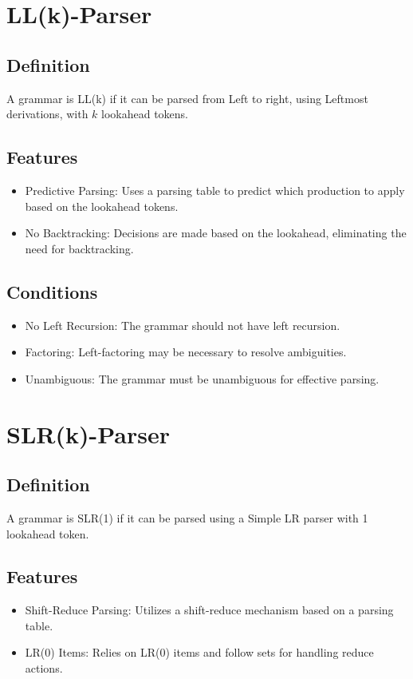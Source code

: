 \section{LL(k)-Parser}

\subsection{Definition}
A grammar is LL(k) if it can be parsed from Left to right, using Leftmost derivations, with \( k \) lookahead tokens.

\subsection{Features}
\begin{itemize}
    \item Predictive Parsing: Uses a parsing table to predict which production to apply based on the lookahead tokens.
    \item No Backtracking: Decisions are made based on the lookahead, eliminating the need for backtracking.
\end{itemize}

\subsection{Conditions}
\begin{itemize}
    \item No Left Recursion: The grammar should not have left recursion.
    \item Factoring: Left-factoring may be necessary to resolve ambiguities.
    \item Unambiguous: The grammar must be unambiguous for effective parsing.
\end{itemize}

\section{SLR(k)-Parser}

\subsection{Definition}
A grammar is SLR(1) if it can be parsed using a Simple LR parser with 1 lookahead token.

\subsection{Features}
\begin{itemize}
    \item Shift-Reduce Parsing: Utilizes a shift-reduce mechanism based on a parsing table.
    \item LR(0) Items: Relies on LR(0) items and follow sets for handling reduce actions.
\end{itemize}

